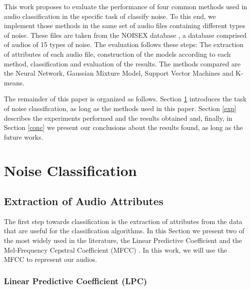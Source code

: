 \documentclass[12pt]{article}
\begin{document}
This work proposes to evaluate the performance of four common methods used in audio classification in the specific task of classify noise. To this end, we implement those methods in the same set of audio files containing different types of noise. These files are taken from the NOISEX database \cite{varga1993assessment}, a database comprised of audios of 15 types of noise. The evaluation follows these steps: The extraction of attributes of each audio file, construction of the models according to each method, classification and evaluation of the results. The methods compared are the Neural Network, Gaussian Mixture Model, Support Vector Machines and K-means.

The remainder of this paper is organized as follows. Section \ref{class} introduces the task of noise classification, as long as the methods used in this paper. Section \ref{exp} describes the experiments performed and the results obtained and, finally, in Section \ref{conc} we present our conclusions about the results found, as long as the future works.

\section{Noise Classification} \label{class}



\subsection{Extraction of Audio Attributes} \label{class:audioatt}

The first step towards classification is the extraction of attributes from the data that are useful for the classification algorithms. In this Section we present two of the most widely used in the literature, the Linear Predictive Coefficient \cite{Rabiner:1993:FSR:153687} and the Mel-Frequency Cepstral Coefficient (MFCC) \cite{xu2005automatic}. In this work, we will use the MFCC to represent our audios.

\subsubsection{Linear Predictive Coefficient (LPC)}\label{class:lpc}
\end{document}
